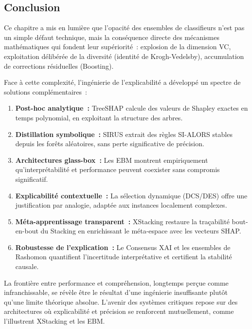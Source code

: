 \subsection{Conclusion}

Ce chapitre a mis en lumière que l'opacité des ensembles de classifieurs n'est pas
un simple défaut technique, mais la conséquence directe des mécanismes mathématiques
qui fondent leur supériorité~: explosion de la dimension VC, exploitation délibérée
de la diversité (identité de Krogh-Vedelsby), accumulation de corrections résiduelles
(Boosting).

Face à cette complexité, l'ingénierie de l'explicabilité a développé un spectre de
solutions complémentaires~:

\begin{enumerate}
  \item \textbf{Post-hoc analytique~:} TreeSHAP calcule des valeurs de Shapley exactes
        en temps polynomial, en exploitant la structure des arbres.

  \item \textbf{Distillation symbolique~:} SIRUS extrait des règles SI-ALORS stables
        depuis les forêts aléatoires, sans perte significative de précision.

  \item \textbf{Architectures glass-box~:} Les EBM montrent empiriquement qu'interprétabilité
        et performance peuvent coexister sans compromis significatif.

  \item \textbf{Explicabilité contextuelle~:} La sélection dynamique (DCS/DES) offre
        une justification par analogie, adaptée aux instances localement complexes.

  \item \textbf{Méta-apprentissage transparent~:} XStacking restaure la traçabilité
        bout-en-bout du Stacking en enrichissant le méta-espace avec les vecteurs SHAP.

  \item \textbf{Robustesse de l'explication~:} Le Consensus XAI et les ensembles de
        Rashomon quantifient l'incertitude interprétative et certifient la stabilité causale.
\end{enumerate}

La frontière entre performance et compréhension, longtemps perçue comme infranchissable,
se révèle être le résultat d'une ingénierie insuffisante plutôt qu'une limite théorique
absolue. L'avenir des systèmes critiques repose sur des architectures où explicabilité
et précision se renforcent mutuellement, comme l'illustrent XStacking et les EBM.
